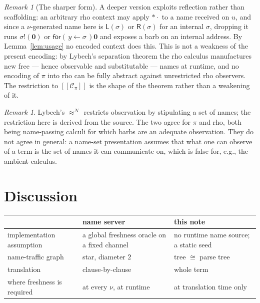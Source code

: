 \documentclass[11pt]{article}
\theoremstyle{definition}
\theoremstyle{plain}
\theoremstyle{remark}
\newtheorem{remark}[definition]{Remark}
\newcommand{\drp}[1]{{*}#1}
\newcommand{\inp}[3]{\mathsf{for}(\,#1 \leftarrow #2\,)#3}
\newcommand{\out}[2]{#1!(#2)}
\newcommand{\enc}[1]{[\![#1]\!]}
\newcommand{\nil}{\mathbf{0}}
\newcommand{\Lft}{\mathsf{L}}
\newcommand{\Rgt}{\mathsf{R}}
\newcommand{\Ctx}{\mathscr{C}}
\newcommand{\bisim}{\approx}
\begin{document}
\begin{remark}[The sharper form]
A deeper version exploits reflection rather than scaffolding: an
arbitrary rho context may apply $\drp{\cdot}$ to a name received on $u$,
and since a $\nu$-generated name here is $\Lft(\sigma)$ or $\Rgt(\sigma)$
for an internal $\sigma$, dropping it runs $\out{\sigma}{\nil}$ or
$\inp{y}{\sigma}{\nil}$ and exposes a barb on an internal address. By
Lemma~\ref{lem:usage} no encoded context does this. This is not a
weakness of the present encoding: by Lybech's separation theorem the rho
calculus manufactures new free --- hence observable and substitutable ---
names at runtime, and no encoding of $\pi$ into rho can be fully abstract
against unrestricted rho observers. The restriction to $\enc{\Ctx_\pi}$
is the shape of the theorem rather than a weakening of it.
\end{remark}

\begin{remark}
Lybech's $\bisim^{\mathcal{N}}$ restricts observation by stipulating a set
of names; the restriction here is derived from the source. The two agree
for $\pi$ and rho, both being name-passing calculi for which barbs are an
adequate observation. They do not agree in general: a name-set
presentation assumes that what one can observe of a term is the set of
names it can communicate on, which is false for, e.g., the ambient
calculus.
\end{remark}

\section{Discussion}\label{sec:discussion}

\begin{center}
\begin{tabular}{@{}p{}p{}p{}@{}}
\toprule
 & name server & this note \\
\midrule
implementation assumption & a global freshness oracle on a fixed channel
  & no runtime name source; a static seed \\
name-traffic graph & star, diameter $2$ & tree $\cong$ parse tree \\
translation & clause-by-clause & whole term \\
where freshness is required & at every $\nu$, at runtime & at translation
  time only \\
\bottomrule
\end{tabular}
\end{center}
\end{document}
